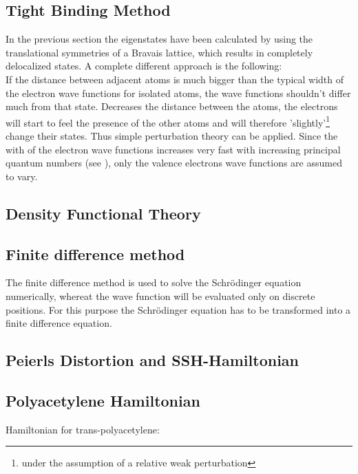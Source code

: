 \subsection{Tight Binding Method}
In the previous section the eigenstates have been calculated by using the translational symmetries of a Bravais lattice, which results in completely delocalized states. A complete different approach is the following:\\
If the distance between adjacent atoms is much bigger than the typical width of the electron wave functions for isolated atoms, the wave functions shouldn't differ much from that state. Decreases the distance between the atoms, the electrons will start to feel the presence of the other atoms and will therefore 'slightly'\footnote{under the assumption of a relative weak perturbation} change their states. Thus simple perturbation theory can be applied. Since the with of the electron wave functions increases very fast with increasing principal quantum numbers (see \cite{landau}), only the valence electrons wave functions are assumed to vary. 


\subsection{Density Functional Theory}



\subsection{Finite difference method}

The finite difference method is used to solve the Schrödinger equation numerically, whereat the wave function will be evaluated only on discrete positions. For this purpose the Schrödinger equation has to be transformed into a finite difference equation.\\

\subsection{Peierls Distortion and SSH-Hamiltonian}

\subsection{Polyacetylene Hamiltonian}
Hamiltonian for trans-polyacetylene:

